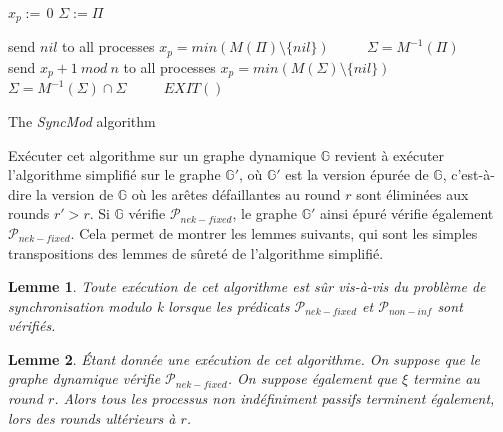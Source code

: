 \documentclass{article}
\newtheorem{lemma}{Lemme}
\begin{document}
\begin{algorithm}[htb]
\begin{distribalgo}[1]
\BLANK {}
  \STATE $x_p :=\, 0$ 
  \STATE $\Sigma := \Pi$

\ENDINDENT \BLANK

    \STATE send $nil$ to all processes
  \ENDINDENT
  \BLANK
	\STATE $x_p = min(M(\Pi) \setminus \{nil\})$ ~~~~
	\STATE $\Sigma = M^{-1}(\Pi)$ ~~~~
  \ENDINDENT
\ENDINDENT \BLANK
{}
    \STATE send $x_p+1~mod~n$ to all processes
  \ENDINDENT
  \BLANK
	\STATE $x_p = min(M(\Sigma) \setminus \{nil\})$ ~~~~
	\STATE $\Sigma = M^{-1}(\Sigma) \cap \Sigma$ ~~~~
	\STATE $EXIT()$ ~~~~
	\ENDIF
  \ENDINDENT
\ENDINDENT \BLANK


\caption{The {\em SyncMod} algorithm} \label{algo:R}
\end{distribalgo}

\end{algorithm}

Exécuter cet algorithme sur un graphe dynamique $\mathds{G}$ revient à exécuter l'algorithme simplifié sur le graphe $\mathds{G}'$, où $\mathds{G}'$ est la version épurée de $\mathds{G}$,
c'est-à-dire la version de $\mathds{G}$ où les arêtes défaillantes au round $r$ sont éliminées aux rounds $r' > r$.
Si $\mathds{G}$ vérifie $\mathcal{P}_{nek-fixed}$, le graphe $\mathds{G}'$ ainsi épuré vérifie également $\mathcal{P}_{nek-fixed}$. Cela permet de montrer les lemmes suivants,
qui sont les simples transpositions des lemmes de sûreté de l'algorithme simplifié.

\begin{lemma}
	Toute exécution de cet algorithme est sûr vis-à-vis du problème de synchronisation modulo k lorsque les prédicats $\mathcal{P}_{nek-fixed}$ et $\mathcal{P}_{non-inf}$ sont vérifiés.
\end{lemma}
\begin{lemma}
	Étant donnée une exécution de cet algorithme. On suppose que le graphe dynamique vérifie $\mathcal{P}_{nek-fixed}$.
	On suppose également que $\xi$ termine au round $r$.
	Alors tous les processus non indéfiniment passifs terminent également, lors des rounds ultérieurs à $r$.
\end{lemma}
\end{document}
